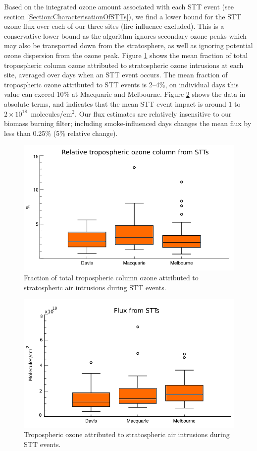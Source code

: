 \documentclass{article}
\begin{document}
  Based on the integrated ozone amount associated with each STT event (see section \ref{Section:CharacterisationOfSTTs}), we find a lower bound for the STT ozone flux over each of our three sites (fire influence excluded).
  This is a conservative lower bound as the algorithm ignores secondary ozone peaks which may also be transported down from the stratosphere, as well as ignoring potential ozone dispersion from the ozone peak.
  Figure \ref{fig:fluxsummary} shows the mean fraction of total tropospheric column ozone attributed to stratospheric ozone intrusions at each site, averaged over days when an STT event occurs.
  The mean fraction of tropospheric ozone attributed to STT events is 2--4\%, on individual days this value can exceed 10\% at Macquarie and Melbourne.
  Figure \ref{fig:fluxsummaryabs} shows the data in absolute terms, and indicates that the mean STT event impact is around $1$ to $2 \times 10^{18}$~molecules/cm$^2$.
  Our flux estimates are relatively insensitive to our biomass burning filter; including smoke-influenced days changes the mean flux by less than 0.25\% (5\% relative change).
  
  \begin{figure}[!htbp]
    \begin{center}
    \includegraphics[width=0.8\columnwidth]{figures/flux_relative.png}
    \caption{Fraction of total tropospheric column ozone attributed to stratospheric air intrusions during STT events.}
    \label{fig:fluxsummary}
    \end{center}
  \end{figure}
  \begin{figure}[!htbp]
    \begin{center}
    \includegraphics[width=0.8\columnwidth]{figures/flux_absolute.png}
    \caption{Tropospheric ozone attributed to stratospheric air intrusions during STT events.}
    \label{fig:fluxsummaryabs}
    \end{center}
  \end{figure}
  
\end{document}
